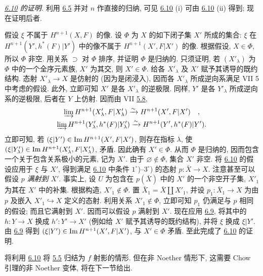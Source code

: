 \noindent
\emph{\hyperref[XII.cor6.10]{6.10} 的证明.} 利用 \hyperref[XII.prop6.5]{6.5} 并对 $n$ 作直接的归纳, 可见 \hyperref[XII.cor6.10]{6.10} (i) 可由 \hyperref[XII.cor6.10]{6.10} (ii) 得到; 现在证明后者.

假设 $\xi$ 不属于 $H^{n+1}(X,F)$ 的像. 设 $\Phi$ 为 $X$ 的如下闭子集 $X'$ 所成的集合: $\xi$ 在 $H^{n+1}(Y',h^{\ast}(F)|Y')$ 中的像不属于 $H^{n+1}(X',F|X')$ 的像. 根据假设, $X\in\Phi$, 所以 $\Phi$ 非空. 用关系 $\supset$ 对 $\Phi$ 排序, 并证明 $\Phi$ 是归纳的. 只须证明, 若 $(X'_{\lambda})$ 为 $\Phi$ 中的一个全序元素族, $X'$ 为其交, 则 $X'\in\Phi$. 给各 $X'_{\lambda}$ 及 $X'$ 赋予其诱导的既约结构. 态射 $X'_{\lambda}\rightarrow X$ 是仿射的 (因为是闭浸入), 因而各 $X'_{\lambda}$ 所成逆向系满足 VII 5 中考虑的假设. 此外, 立即可知 $X'$ 是各 $X'_{\lambda}$ 的逆极限. 同样, $Y'$ 是各 $Y'_{\lambda}$ 所成逆向系的逆极限, 后者在 $Y$ 上仿射. 因而由 VII \hyperref[VII.cor5.8]{5.8},
$$
\begin{gathered}
\varinjlim H^{n+1}(X'_{\lambda},F|X'_{\lambda})\xrightarrow{\sim}
H^{n+1}(X',F|X')\quad,\\
\varinjlim H^{n+1}(Y'_{\lambda},h^{\ast}(F)|Y'_{\lambda})
\xrightarrow{\sim}H^{n+1}(Y',h^{\ast}(F)|Y'){}.
\end{gathered}
$$
立即可知, 若 $(\xi|Y')\in\operatorname{Im} H^{n+1}(X',F|X')$, 则\pageoriginale 存在指标 $\lambda$, \linebreak 使 $(\xi|Y'_{\lambda})\in\allowbreak\operatorname{Im} H^{n+1}(X'_{\lambda},F|X'_{\lambda})$, 矛盾. 因此确有 $X'\in\Phi$. 从而 $\Phi$ 是归纳的, 因而包含一个关于包含关系极小的元素, 记为 $X'$. 由于 $\varnothing\notin\Phi$, 集合 $X'$ 非空. 将 \hyperref[XII.cor6.10]{6.10} 的假设应用于 $\xi$ 与 $X'$, 得到满足 \hyperref[XII.cor6.10]{6.10} 中条件 $1^{\circ}$)--$3^{\circ}$) 的态射 $p:\bar{X}\rightarrow X$. 注意甚至可以假设 $p$ \emph{满射到 $X'$}. 事实上, 设 $U$ 为包含在 $p(\bar{X})$ 中的 $X'$ 的一个非空开子集, $X'_1$ 为其在 $X'$ 中的补集. 根据构造, $X'_1\notin\Phi$. 置 $\bar{X}_1=\bar{X}\amalg X'_1$, 并设 $p_1:\bar{X}_1\rightarrow X$ 为由 $p$ 及嵌入 $X'_1\hookrightarrow X$ 定义的态射. 利用关系 $X'_1\notin\Phi$, 立即可知 $p_1$ 仍满足与 $p$ 相同的假设; 而且它满射到 $X'$. 因而可以假设 $p$ 满射到 $X'$. 现在应用 \hyperref[XII.cor6.9]{6.9}, 将其中的 $h:Y\rightarrow X$ 换成 $h':Y'\rightarrow X'$ (例如给 $X'$ 赋予其诱导的既约结构), 并将 $\xi$ 换成 $\xi|Y'$. 由 \hyperref[XII.cor6.9]{6.9} 得到 $(\xi|Y')\in\operatorname{Im} H^{n+1}(X',F|X')$, 与 $X'\in\Phi$ 矛盾. 至此完成了 \hyperref[XII.cor6.10]{6.10} 的证明.

将利用 \hyperref[XII.cor6.10]{6.10} 将 \hyperref[XII.cor5.5]{5.5} 归结为 $f$ 射影的情形. 但在非 Noether 情形下, 这需要 Chow 引理的非 Noether 变体, 将在下一节给出.

